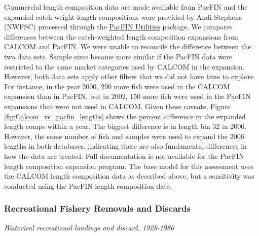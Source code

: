 \documentclass[12pt,]{article}
\begin{document}
Commercial length composition data are made available from PacFIN and
the expanded catch-weight length compositions were provided by Andi
Stephens (NWFSC) processed through the
\href{https://github.com/nwfsc-assess/PacFIN.Utilities}{PacFIN
Utilities} package. We compares differences between the catch-weighted
length composition expansions from CALCOM and PacFIN. We were unable to
reconcile the difference between the two data sets. Sample sizes became
more similar if the PacFIN data were restricted to the same market
categories used by CALCOM in the expansion. However, both data sets
apply other filters that we did not have time to explore. For instance,
in the year 2000, 290 more fish were used in the CALCOM expansion than
in PacFIN, but in 2002, 150 more fish were used in the PacFIN expansions
that were not used in CALCOM. Given these caveats, Figure
\ref{fig:Calcom_vs_pacfin_lengths} shows the percent difference in the
expanded length comps within a year. The biggest difference is in length
bin 32 in 2006. However, the same number of fish and samples were used
to expand the 2006 lengths in both databases, indicating there are also
fundamental differences in how the data are treated. Full documentation
is not available for the PacFIN length composition expansion program.
The base model for this assessment uses the CALCOM length composition
data as described above, but a sensitivity was conducted using the
PacFIN length composition data.

\subsubsection{Recreational Fishery Removals and
Discards}\label{recreational-fishery-removals-and-discards}

\emph{Historical recreational landings and discard, 1928-1980}
\end{document}
